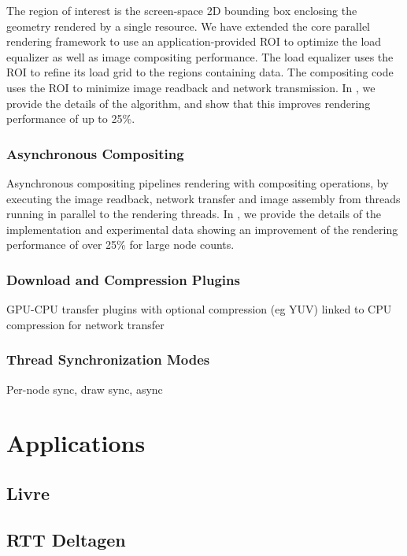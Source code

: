 \documentclass[journal]{vgtc}                %
\begin{document}
The region of interest is the screen-space 2D bounding box enclosing the
geometry rendered by a single resource. We have extended the core parallel
rendering framework to use an application-provided ROI to optimize the load
equalizer as well as image compositing performance. The load equalizer uses the
ROI to refine its load grid to the regions containing data. The compositing code
uses the ROI to minimize image readback and network transmission. In
\cite{EBAHMP:12}, we provide the details of the algorithm, and show that this
improves rendering performance of up to 25\%.

\subsubsection{Asynchronous Compositing}

Asynchronous compositing pipelines rendering with compositing operations, by
executing the image readback, network transfer and image assembly from threads
running in parallel to the rendering threads. In \cite{EBAHMP:12}, we provide
the details of the implementation and experimental data showing an improvement
of the rendering performance of over 25\% for large node counts.

\subsubsection{Download and Compression Plugins}

GPU-CPU transfer plugins with optional compression (eg YUV) linked to CPU
compression for network transfer

\subsubsection{Thread Synchronization Modes}\label{SEC_threading}

Per-node sync, draw sync, async

\section{Applications}

\subsection{Livre}
\subsection{RTT Deltagen}
\end{document}
